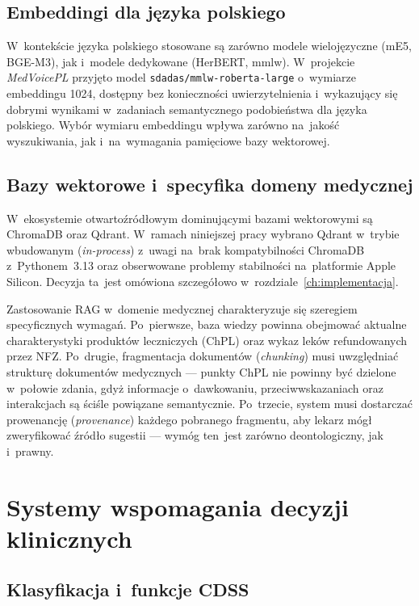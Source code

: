 \subsection{Embeddingi dla języka polskiego}

W~kontekście języka polskiego stosowane są zarówno modele
wielojęzyczne (mE5, BGE-M3), jak i~modele dedykowane (HerBERT, mmlw).
W~projekcie \emph{MedVoicePL} przyjęto model \texttt{sdadas/mmlw-roberta-large}
o~wymiarze embeddingu 1024, dostępny bez konieczności uwierzytelnienia
i~wykazujący się dobrymi wynikami w~zadaniach semantycznego
podobieństwa dla języka polskiego. Wybór wymiaru embeddingu wpływa
zarówno na~jakość wyszukiwania, jak i~na~wymagania pamięciowe
bazy wektorowej.

\subsection{Bazy wektorowe i~specyfika domeny medycznej}

W~ekosystemie otwartoźródłowym dominującymi bazami wektorowymi są
ChromaDB \parencite{chromadb} oraz Qdrant. W~ramach niniejszej pracy
wybrano Qdrant w~trybie wbudowanym (\emph{in-process}) z~uwagi
na~brak kompatybilności ChromaDB z~Pythonem~3.13 oraz obserwowane
problemy stabilności na~platformie Apple Silicon. Decyzja ta~jest
omówiona szczegółowo w~rozdziale~\ref{ch:implementacja}.

Zastosowanie RAG w~domenie medycznej charakteryzuje się szeregiem
specyficznych wymagań. Po~pierwsze, baza wiedzy powinna obejmować
aktualne charakterystyki produktów leczniczych (ChPL) oraz wykaz
leków refundowanych przez NFZ. Po~drugie, fragmentacja dokumentów
(\emph{chunking}) musi uwzględniać strukturę dokumentów medycznych
--- punkty ChPL nie powinny być dzielone w~połowie zdania, gdyż
informacje o~dawkowaniu, przeciwwskazaniach oraz interakcjach są
ściśle powiązane semantycznie. Po~trzecie, system musi dostarczać
prowenancję (\emph{provenance}) każdego pobranego fragmentu, aby
lekarz mógł zweryfikować źródło sugestii --- wymóg ten~jest
zarówno deontologiczny, jak i~prawny.

\section{Systemy wspomagania decyzji klinicznych}\label{sec:cdss-stan}

\subsection{Klasyfikacja i~funkcje CDSS}

